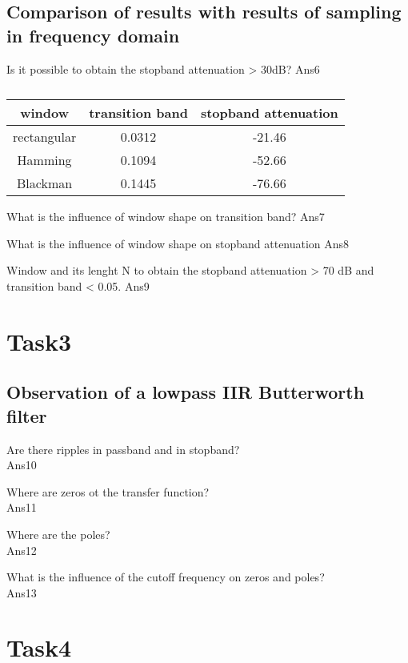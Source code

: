 \documentclass{article}
\begin{document}
\subsection*{Comparison of results with results of sampling in frequency domain}

Is it possible to obtain the stopband attenuation > 30dB?
Ans6

\begin{table}[h!]
  \begin{center}
    \caption{}
    \label{tab:task1tab}
    \begin{tabular}{c|c|c} 
      \textbf{window} & \textbf{transition band} & \textbf{stopband attenuation} \\
      \hline
        rectangular & 0.0312 & -21.46 \\
        Hamming     & 0.1094 & -52.66 \\
        Blackman    & 0.1445 & -76.66 \\
    \end{tabular}
  \end{center}
\end{table}

What is the influence of window shape on transition band?
Ans7

What is the influence of window shape on stopband attenuation
Ans8

Window and its lenght N to obtain the stopband attenuation > 70 dB and 
transition band < 0.05.
Ans9

\section*{Task3}
\subsection*{Observation of a lowpass IIR Butterworth filter}

Are there ripples in passband and in stopband? \\
Ans10

Where are zeros ot the transfer function? \\
Ans11

Where are the poles? \\
Ans12

What is the influence of the cutoff frequency on zeros and poles? \\
Ans13

\section*{Task4}
\end{document}
